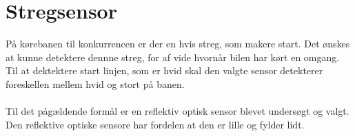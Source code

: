 \section{Stregsensor}
På kørebanen til konkurrencen er der en hvis streg, som makere start. Det ønskes at kunne detektere dennne streg, for af vide hvornår bilen har kørt en omgang.\\
Til at dektektere start linjen, som er hvid skal den valgte sensor detekterer foreskellen mellem hvid og stort på banen.\\
 \\
Til det pågældende formål er en reflektiv optisk sensor blevet undersøgt og valgt. Den reflektive optiske sensore har fordelen at den er lille og fylder lidt.\\
\\

